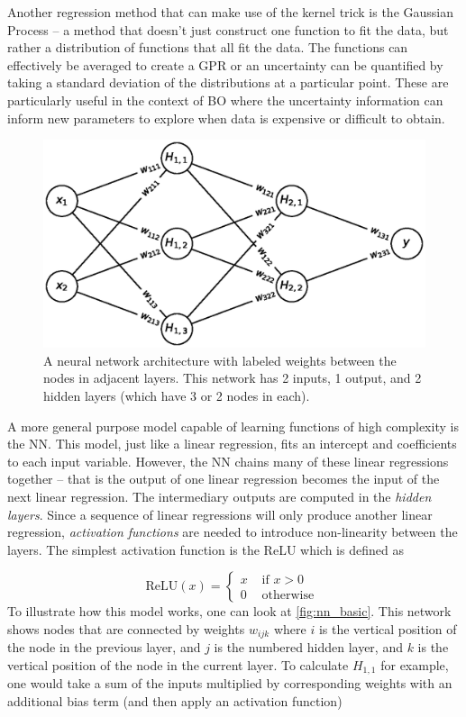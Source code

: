Another regression method that can make use of the kernel trick is the Gaussian Process -- a method that doesn't just construct one function to fit the data, but rather a distribution of functions that all fit the data. The functions can effectively be averaged to create a \gls{GPR} or an uncertainty can be quantified by taking a standard deviation of the distributions at a particular point. These are particularly useful in the context of \gls{BO} where the uncertainty information can inform new parameters to explore when data is expensive or difficult to obtain.

\begin{figure}
	\centering 
	\includegraphics[width=0.8\linewidth]{planning/images/nn_basic.eps}
	\caption{A neural network architecture with labeled weights between the nodes in adjacent layers. This network has 2 inputs, 1 output, and 2 hidden layers (which have 3 or 2 nodes in each).}
	\label{fig:nn_basic}
\end{figure}

A more general purpose model capable of learning functions of high complexity is the \gls{NN}. This model, just like a linear regression, fits an intercept and coefficients to each input variable. However, the \gls{NN} chains many of these linear regressions together -- that is the output of one linear regression becomes the input of the next linear regression. The intermediary outputs are computed in the \emph{hidden layers}. Since a sequence of linear regressions will only produce another linear regression, \emph{activation functions} are needed to introduce non-linearity between the layers. The simplest activation function is the \gls{ReLU} which is defined as

\begin{equation}
	\text{ReLU}(x) =
	\begin{cases}
	 x &\text{ if } x > 0 \\
	 0 &\text{ otherwise }
	\end{cases}
\end{equation}  
To illustrate how this model works, one can look at \autoref{fig:nn_basic}. This network shows nodes that are connected by weights $w_{ijk}$ where $i$ is the vertical position of the node in the previous layer, and $j$ is the numbered hidden layer, and $k$ is the vertical position of the node in the current layer. To calculate $H_{1,1}$ for example, one would take a sum of the inputs multiplied by corresponding weights with an additional bias term (and then apply an activation function)

